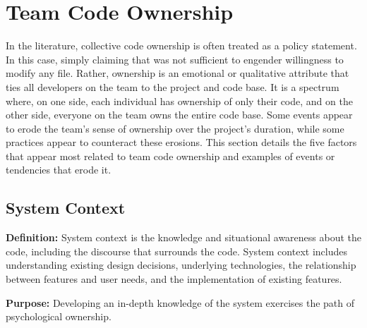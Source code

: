 



\section{Team Code Ownership}
\label{TeamCodeOwnership}


In the literature, collective code ownership is often treated as a policy statement. In this case, simply claiming that  was not sufficient to engender willingness to modify any file. Rather, ownership is an emotional or qualitative attribute that ties all developers on the team to the project and code base. It is a spectrum where, on one side, each individual has ownership of only their code, and on the other side, everyone on the team owns the entire code base. Some events appear to erode the team's sense of ownership over the project's duration, while some practices appear to counteract these erosions. This section details the five factors that appear most related to team code ownership and examples of events or tendencies that erode it. 


\subsection{System Context}
\textbf{Definition:} System context is the knowledge and situational awareness about the code, including the discourse that surrounds the code. System context includes understanding existing design decisions, underlying technologies, the relationship between features and user needs, and the implementation of existing features.


\textbf{Purpose:} Developing an in-depth knowledge of the system exercises the  path of psychological ownership.


